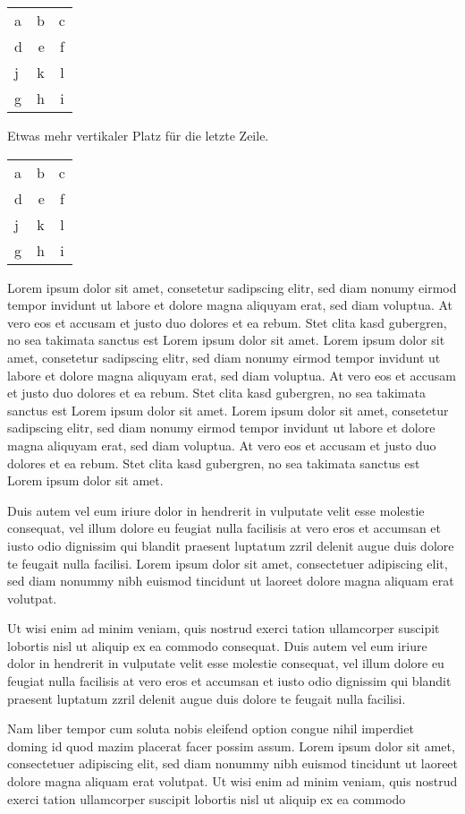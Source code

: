 \begin{tabular}{lrc} \toprule[2pt]
a & b & c \\ \cmidrule[1pt](rl){1-3}
d & e & f \\
j & k & l \\
g & h & i \\ \bottomrule[2pt]
\end{tabular}

Etwas mehr vertikaler Platz für die letzte Zeile.

\begin{tabular}{lrc} \toprule[2pt]
a & b & c \\ \cmidrule[1pt](rl){1-3}
d & e & f \\ 
j & k & l \\ \addlinespace[0.5em]
g & h & i \\ \bottomrule[2pt] 
\end{tabular}

Lorem ipsum dolor sit amet, consetetur sadipscing elitr, sed diam nonumy eirmod tempor invidunt ut labore et dolore magna aliquyam erat, sed diam voluptua. At vero eos et accusam et justo duo dolores et ea rebum. Stet clita kasd gubergren, no sea takimata sanctus est Lorem ipsum dolor sit amet. Lorem ipsum dolor sit amet, consetetur sadipscing elitr, sed diam nonumy eirmod tempor invidunt ut labore et dolore magna aliquyam erat, sed diam voluptua. At vero eos et accusam et justo duo dolores et ea rebum. Stet clita kasd gubergren, no sea takimata sanctus est Lorem ipsum dolor sit amet. Lorem ipsum dolor sit amet, consetetur sadipscing elitr, sed diam nonumy eirmod tempor invidunt ut labore et dolore magna aliquyam erat, sed diam voluptua. At vero eos et accusam et justo duo dolores et ea rebum. Stet clita kasd gubergren, no sea takimata sanctus est Lorem ipsum dolor sit amet.   

Duis autem vel eum iriure dolor in hendrerit in vulputate velit esse molestie consequat, vel illum dolore eu feugiat nulla facilisis at vero eros et accumsan et iusto odio dignissim qui blandit praesent luptatum zzril delenit augue duis dolore te feugait nulla facilisi. Lorem ipsum dolor sit amet, consectetuer adipiscing elit, sed diam nonummy nibh euismod tincidunt ut laoreet dolore magna aliquam erat volutpat.   

Ut wisi enim ad minim veniam, quis nostrud exerci tation ullamcorper suscipit lobortis nisl ut aliquip ex ea commodo consequat. Duis autem vel eum iriure dolor in hendrerit in vulputate velit esse molestie consequat, vel illum dolore eu feugiat nulla facilisis at vero eros et accumsan et iusto odio dignissim qui blandit praesent luptatum zzril delenit augue duis dolore te feugait nulla facilisi.   

Nam liber tempor cum soluta nobis eleifend option congue nihil imperdiet doming id quod mazim placerat facer possim assum. Lorem ipsum dolor sit amet, consectetuer adipiscing elit, sed diam nonummy nibh euismod tincidunt ut laoreet dolore magna aliquam erat volutpat. Ut wisi enim ad minim veniam, quis nostrud exerci tation ullamcorper suscipit lobortis nisl ut aliquip ex ea commodo
